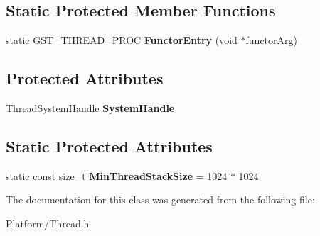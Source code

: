 \subsection*{Static Protected Member Functions}
\begin{DoxyCompactItemize}
\item 
\mbox{\label{class_gost_crypt_1_1_thread_a47954639ef44916ea88288b68be56f5a}} 
static G\+S\+T\+\_\+\+T\+H\+R\+E\+A\+D\+\_\+\+P\+R\+OC {\bfseries Functor\+Entry} (void $\ast$functor\+Arg)
\end{DoxyCompactItemize}
\subsection*{Protected Attributes}
\begin{DoxyCompactItemize}
\item 
\mbox{\label{class_gost_crypt_1_1_thread_a2d8b47e78fd975b4f2c16fd76b5d8805}} 
Thread\+System\+Handle {\bfseries System\+Handle}
\end{DoxyCompactItemize}
\subsection*{Static Protected Attributes}
\begin{DoxyCompactItemize}
\item 
\mbox{\label{class_gost_crypt_1_1_thread_a196f26400e8925c97b60448e5c6a7a85}} 
static const size\+\_\+t {\bfseries Min\+Thread\+Stack\+Size} = 1024 $\ast$ 1024
\end{DoxyCompactItemize}


The documentation for this class was generated from the following file\+:\begin{DoxyCompactItemize}
\item 
Platform/Thread.\+h\end{DoxyCompactItemize}
